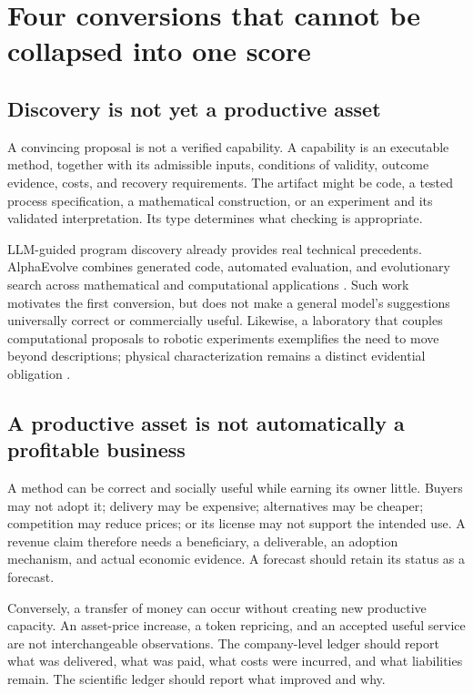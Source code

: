 \documentclass[11pt,letterpaper]{article}
\newcommand{\1}{\mathbf 1}
\theoremstyle{remark}\newtheorem{remark}{Remark}[section]
\begin{document}
\section{Four conversions that cannot be collapsed into one score}\label{sec:conversions}
\subsection{Discovery is not yet a productive asset}
A convincing proposal is not a verified capability. A capability is an executable method, together with its admissible inputs, conditions of validity, outcome evidence, costs, and recovery requirements. The artifact might be code, a tested process specification, a mathematical construction, or an experiment and its validated interpretation. Its type determines what checking is appropriate.

LLM-guided program discovery already provides real technical precedents. AlphaEvolve combines generated code, automated evaluation, and evolutionary search across mathematical and computational applications \citep{alphaevolve}. Such work motivates the first conversion, but does not make a general model's suggestions universally correct or commercially useful. Likewise, a laboratory that couples computational proposals to robotic experiments exemplifies the need to move beyond descriptions; physical characterization remains a distinct evidential obligation \citep{alab}.

\subsection{A productive asset is not automatically a profitable business}
A method can be correct and socially useful while earning its owner little. Buyers may not adopt it; delivery may be expensive; alternatives may be cheaper; competition may reduce prices; or its license may not support the intended use. A revenue claim therefore needs a beneficiary, a deliverable, an adoption mechanism, and actual economic evidence. A forecast should retain its status as a forecast.

Conversely, a transfer of money can occur without creating new productive capacity. An asset-price increase, a token repricing, and an accepted useful service are not interchangeable observations. The company-level ledger should report what was delivered, what was paid, what costs were incurred, and what liabilities remain. The scientific ledger should report what improved and why.
\end{document}
